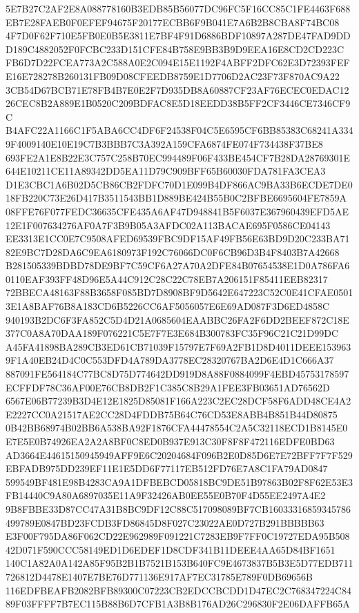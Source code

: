 \documentclass[UTF8,fontset=fandol,zihao=-4,a4paper]{ctexart}
\begin{document}
{{5E7B27C2AF2E8A088778160B3EDB85B56077DC96FC5F16CC85C1FE4463F688EB7E28FAEB0F0EFEF94675F20177ECBB6F9B041E7A6B2B8CBA8F74BC08
4F7D0F62F710E5FB0E0B5E3811E7BF4F91D6886BDF10897A287DE47FAD9DDD189C4882052F0FCBC233D151CFE84B758E9BB3B9D9EEA16E8CD2CD223C
FB6D7D22FCEA773A2C588A0E2C094E15E1192F4ABFF2DFC62E3D72393FEFE16E728278B260131FB09D08CFEEDB8759E1D7706D2AC23F73F870AC9A22
3CB54D67BCB71E78FB4B7E0E2F7D935DB8A60887CF23AF76ECEC0EDAC1226CEC8B2A889E1B0520C209BDFAC8E5D18EEDD38B5FF2CF3446CE7346CF9C
B4AFC22A1166C1F5ABA6CC4DF6F24538F04C5E6595CF6BB85383C68241A3349F4009140E10E19C7B3BBB7C3A392A159CFA6874FE074F734438F37BE8
693FE2A1E8B22E3C757C258B70EC994489F06F433BE454CF7B28DA28769301E644E10211CE11A89342DD5EA11D79C909BFF65B60030FDA781FA3CEA3
D1E3CBC1A6B02D5CB86CB2FDFC70D1E099B4DF866AC9BA33B6ECDE7DE018FB220C73E26D417B3511543BB1D889BE424B55B0C2BFBE6695604FE7859A
08FFE76F077FEDC36635CFE435A6AF47D948841B5F6037E367960439EFD5AE12E1F007634276AF0A7F3B9B05A3AFDC02A113BACAE695F0586CE04143
EE3313E1CC0E7C9508AFED69539FBC9DF15AF49FB56E63BD9D20C233BA7182E9BC7D28DA6C9EA6180973F192C76066DC0F6CB96D3B4F8403B7A42668
B281505339BDBD78DE9BF7C59CF6A27A70A2DFE84B07654538E1D0A786FA60110EAF393FF48D96E5A44C912C28C22C78EB7A206151F85411EEB82317
72BBECA48163F88B3658F085BD7D8908BF9D5642E647223C52C0E41CFAE05013E1A8BAF76B8A183CD6B5226CC6AF5056057E6E69AD087F3D6ED4858C
940193B2DC6F3FA852C5D4D21A0685604EAABBC26FA2F6DD2BEEF872C18E377C0A8A70DAA189F076221C5E7F7E3E684B300783FC35F96C21C21D99DC
A45FA41898BA289CB3ED61CB71039F15797E7F69A2FB1D8D4011DEEE1539639F1A40EB24D4C0C553DFD4A789DA3778EC28320767BA2D6E4D1C666A37
887091FE564184C77BC8D75D774642DD919D8A88F0884099F4EBD45753178597ECFFDF78C36AF00E76CB8DB2F1C385C8B29A1FEE3FB03651AD76562D
6567E06B77239B3D4E12E1825D85081F166A223C2EC28DCF58F6ADD48CE4A2E2227CC0A21517AE2CC28D4FDDB75B64C76CD53E8ABB4B851B44D80875
0B42BB68974B02BB6A538BA92F1876CFA44478554C2A5C32118ECD1B8145E0E7E5E0B74926EA2A2A8BF0C8ED0B937E913C30F8F8F472116EDFE0BD63
AD3664E44615150945949AFF9E6C20204684F096B2E0D85D6E7E72BFF7F7F529EBFADB975DD239EF11E1E5DD6F77117EB512FD76E7A8C1FA79AD0847
599549BF481E98B4283CA9A1DFBEBCD05818BC9DE51B97863B02F8F62E53E3FB14440C9A80A6897035E11A9F32426AB0EE55E0B70F4D55EE2497A4E2
9B8FBBE33D87CC47A31B8BC9DF12C88C517098089BF7CB16033316859345786499789E0847BD23FCDB3FD86845D8F027C23022AE0D727B291BBBBB63
E3F00F795DA86F062CD22E962989F091221C7283EB9F7FF0C19727EDA95B50842D071F590CCC58149ED1D6EDEF1D8CDF341B11DEEE4AA65D84BF1651
140C1A82A0A142A85F95B2B1B7521B153B640FC9E4673837B5B3E5D77EDB711726812D4478E1407E7BE76D771136E917AF7EC31785E789F0DB69656B
116EDFBEAFB2082BFB89300C07223CB2EDCCBCDD1D47EC2C768347224C8489F03FFFF7B7EC115B88B6D7CFB1A3B8B176AD26C296830F2E06DAFFB65A
}}
\end{document}
